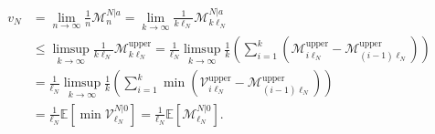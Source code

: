 \begin{align*}
    v_N
    &=
    \lim_{n\to\infty}
    \frac{1}{n}\mathcal M^{N|a}_n
    =
    \lim_{k\to\infty}
    \frac 1{k\ell_N}
    \mathcal M^{N|a}_{k\ell_N}
    \\ &
    \le
    \limsup_{k\to\infty}
    \frac 1{k\ell_N}
    \mathcal M^{\mathrm{upper}}_{k\ell_N}
    =
    \frac 1{\ell_N}
    \limsup_{k\to\infty}
    \frac 1{k}
    \left(
        \sum_{i=1}^k
        \left(
            \mathcal M^{\mathrm{upper}}_{i\ell_N}
            -
            \mathcal M^{\mathrm{upper}}_{(i-1)\ell_N}
        \right)
    \right)
    \\ &
    =
    \frac 1{\ell_N}
    \limsup_{k\to\infty}
    \frac 1{k}
    \left(
        \sum_{i=1}^k
        \min
        \left(
            \mathcal V^{\mathrm{upper}}_{i\ell_N}
            -
            \mathcal M^{\mathrm{upper}}_{(i-1)\ell_N}
        \right)
    \right)
    \\ &
    =
    \frac 1{\ell_N}
    \mathbb E\left[
        \min\mathcal V^{N|0}_{\ell_N}
    \right]
    =
    \frac 1{\ell_N}
    \mathbb E\left[
        \mathcal M^{N|0}_{\ell_N}
    \right].
\end{align*}
